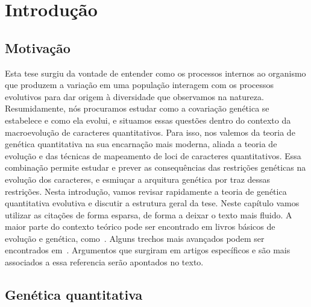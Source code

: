 \cleardoublepage

\pagestyle{fancy}


\chapter{Introdução}\label{intro}


\section{Motivação}\label{intro:historico}

\begin{refsection}

Esta tese surgiu da vontade de entender como os processos internos ao
organismo que produzem a variação em uma população interagem com os processos
evolutivos para dar origem à diversidade que observamos na natureza.
Resumidamente, nós procuramos estudar como a covariação genética se estabelece
e como ela evolui, e situamos essas questões dentro do contexto da
macroevolução de caracteres quantitativos. Para isso, nos valemos da teoria de
genética quantitativa na sua encarnação mais moderna, aliada a teoria de
evolução e das técnicas de mapeamento de loci de caracteres quantitativos.
Essa combinação permite estudar e prever as consequências das restrições
genéticas na evolução dos caracteres, e esmiuçar a arquitura genética por traz
dessas restrições. Nesta introdução, vamos revisar rapidamente a teoria de
genética quantitativa evolutiva e discutir a estrutura geral da tese. Neste
capítulo vamos utilizar as citações de forma esparsa, de forma a deixar o texto mais
fluido. A maior parte do contexto teórico pode ser encontrado em livros
básicos de evolução e genética, como~\textcite{Falconer1996-ot,
Lynch1998-ql, Barton2007-hq}. Alguns trechos mais avançados podem ser
encontrados em~\textcite{Rice2004-jf, Buerger2000-ez}. Argumentos que surgiram
em artigos específicos e são mais associados a essa referencia serão
apontados no texto.

\section{Genética quantitativa} 



\printbibliography
\end{refsection}